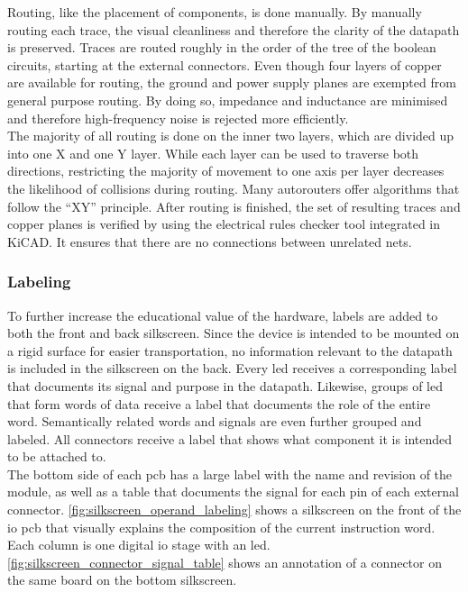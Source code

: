 Routing, like the placement of components, is done manually. By manually routing each trace, the visual cleanliness and therefore the clarity of the datapath is preserved. Traces are routed roughly in the order of the tree of the boolean circuits, starting at the external connectors. Even though four layers of copper are available for routing, the ground and power supply planes are exempted from general purpose routing. By doing so, impedance and inductance are minimised and therefore high-frequency noise is rejected more efficiently\cite{peterson_pcb_2021}.
\\

The majority of all routing is done on the inner two layers, which are divided up into one X and one Y layer. While each layer can be used to traverse both directions, restricting the majority of movement to one axis per layer decreases the likelihood of collisions during routing. Many autorouters offer algorithms that follow the ``XY'' principle\cite{terratel_pcb_routing_2025}. After routing is finished, the set of resulting traces and copper planes is verified by using the electrical rules checker tool integrated in KiCAD. It ensures that there are no connections between unrelated nets.

\subsubsection{Labeling}

To further increase the educational value of the hardware, labels are added to both the front and back silkscreen. Since the device is intended to be mounted on a rigid surface for easier transportation, no information relevant to the datapath is included in the silkscreen on the back. Every \ac{led} receives a corresponding label that documents its signal and purpose in the datapath. Likewise, groups of \ac{led} that form words of data receive a label that documents the role of the entire word. Semantically related words and signals are even further grouped and labeled. All connectors receive a label that shows what component it is intended to be attached to.
\\

The bottom side of each \ac{pcb} has a large label with the name and revision of the module, as well as a table that documents the signal for each pin of each external connector. \autoref{fig:silkscreen_operand_labeling} shows a silkscreen on the front of the \ac{io} \ac{pcb} that visually explains the composition of the current instruction word. Each column is one digital \ac{io} stage with an \ac{led}. \autoref{fig:silkscreen_connector_signal_table} shows an annotation of a connector on the same board on the bottom silkscreen.

